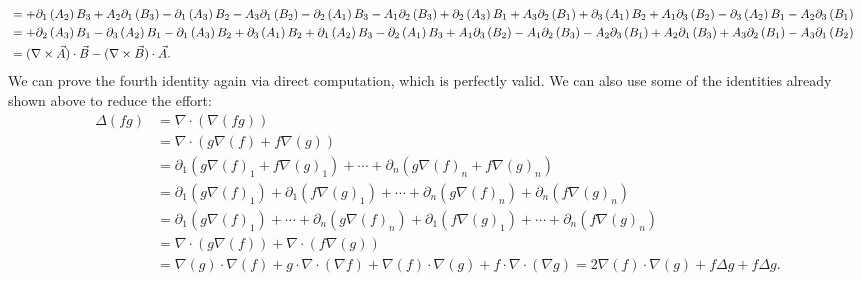 \documentclass[11pt]{article}
\begin{document}
\begin{solution}
\begin{align*}
        \\&=
        + \partial_1\left( A_2 \right) B_3 + A_2 \partial_1\left( B_3 \right) - \partial_1\left( A_3 \right) B_2 - A_3 \partial_1\left( B_2 \right) 
        - \partial_2\left( A_1 \right) B_3 - A_1 \partial_2\left( B_3 \right) + \partial_2\left( A_3 \right) B_1 + A_3 \partial_2\left( B_1 \right) 
        + \partial_3\left( A_1 \right) B_2 + A_1 \partial_3\left( B_2 \right) - \partial_3\left( A_2 \right) B_1 - A_2 \partial_3\left( B_1 \right)
        \\&=
         + \partial_2\left( A_3 \right) B_1 - \partial_3\left( A_2 \right) B_1 
         - \partial_1\left( A_3 \right) B_2 + \partial_3\left( A_1 \right) B_2
         + \partial_1\left( A_2 \right) B_3 - \partial_2\left( A_1 \right) B_3 
         + A_1 \partial_3\left( B_2 \right) - A_1 \partial_2\left( B_3 \right)
         - A_2 \partial_3\left( B_1 \right) + A_2 \partial_1\left( B_3 \right) 
         + A_3 \partial_2\left( B_1 \right) - A_3 \partial_1\left( B_2 \right) 
        \\&=
        ( \nabla\times\vec{A} ) \cdot \vec{B} - ( \nabla\times\vec{B} ) \cdot \vec{A}
        .
    \end{align*}
    We can prove the fourth identity again via direct computation, which is perfectly valid. 
    We can also use some of the identities already shown above to reduce the effort:
    \begin{align*}
        \Delta ( f g )
        &= 
        \nabla \cdot ( \nabla ( f g ) )
        \\&= 
        \nabla \cdot ( g \nabla(f) + f \nabla(g) )
        \\&= 
        \partial_1( g \nabla(f)_1 + f \nabla(g)_1 ) + \cdots + \partial_n( g \nabla(f)_n + f \nabla(g)_n )
        \\&= 
        \partial_1( g \nabla(f)_1 ) + \partial_1( f \nabla(g)_1 ) + \cdots + \partial_n( g \nabla(f)_n ) + \partial_n( f \nabla(g)_n )
        \\&= 
        \partial_1( g \nabla(f)_1 ) + \cdots + \partial_n( g \nabla(f)_n ) + \partial_1( f \nabla(g)_1 ) + \cdots + \partial_n( f \nabla(g)_n )
        \\&= 
        \nabla \cdot ( g \nabla(f) ) + \nabla \cdot ( f \nabla(g) )
        \\&= 
        \nabla(g) \cdot \nabla(f) + g \cdot \nabla\cdot(\nabla f) + \nabla(f) \cdot \nabla(g) + f \cdot \nabla\cdot(\nabla g)
        = 
        2 \nabla(f) \cdot \nabla( g ) + f \Delta g + f \Delta g
        .
    \end{align*}

\end{solution}
\end{document}
